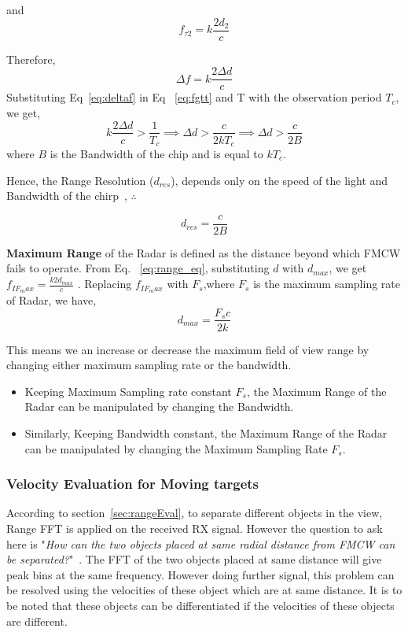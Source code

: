  and
  \begin{equation}
   f_{\tau2}= k\frac{2d_{2}}{c}
 \end{equation} 
 
 Therefore, 
 \begin{equation}\label{eq:deltaf}
     \Delta f = k\frac{2\Delta d}{c}
 \end{equation}
Substituting Eq~\ref{eq:deltaf} in Eq ~\ref{eq:fgtt} and T with the observation period $T_{c}$, we get,
\begin{equation}
  k\frac{2\Delta d}{c} > \frac{1}{T_{c}}  \implies \Delta d > \frac{c}{2kT_{c}} \implies \Delta d > \frac{c}{2B}  
\end{equation}
where $B$ is the Bandwidth of the chip and is equal to $kT_{c}$.

Hence, the Range Resolution ($d_{res}$), depends only on the speed of the light and Bandwidth of the chirp~\cite{rao_2017}, $\therefore$ 

\begin{equation}
   d_{res} = \frac{c}{2B} 
\end{equation}

\textbf{Maximum Range} of the Radar is defined as the distance beyond which FMCW fails to operate. From Eq. ~\ref{eq:range_eq}, substituting $d$ with $d_{max}$, we get \(f_{IF_max} = \frac{k2d_{max}}{c}\) . Replacing $f_{IF_max}$ with $F_{s}$,where $F_{s}$ is the maximum sampling rate of Radar, we have,
\begin{equation}
    d_{max}= \frac{F_{s}c}{2k}
\end{equation}

This means we an increase or decrease the maximum field of view range by changing either maximum sampling rate or the bandwidth.
\begin{itemize}
    \item Keeping Maximum Sampling rate constant $F_{s}$, the Maximum Range of the Radar can be manipulated by changing the Bandwidth.
    \item Similarly,  Keeping Bandwidth constant, the Maximum Range of the Radar can be manipulated by changing the Maximum Sampling Rate $F_{s}$.
\end{itemize}



\subsubsection{Velocity Evaluation for Moving targets}
According to section~\ref{sec:rangeEval}, to separate different objects in the view, Range FFT is applied on the received RX signal. However the question to ask here is "\textit{How can the two objects placed at same radial distance from FMCW can be separated?}"~\cite{rao_2017}. The FFT of the two objects placed at same distance will give peak bins at the same frequency. However doing further signal, this problem can be resolved using the velocities of these object which are at same distance. It is to be noted that these objects can be differentiated if the velocities of these objects are different.

